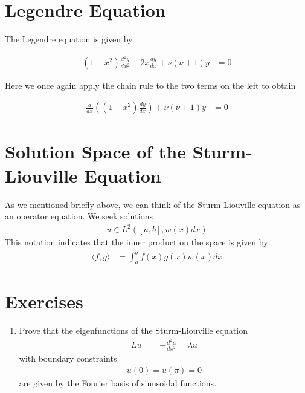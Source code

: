 \documentclass[book.tex]{subfiles}
\begin{document}
\section{Legendre Equation}
The Legendre equation is given by

\begin{align}
    (1 - x^2)\frac{d^2 y}{dx^2} - 2 x \frac{dy}{dx} + \nu (\nu + 1) y &= 0
\end{align}

Here we once again apply the chain rule to the two terms on the left to obtain

\begin{align}
    \frac{d}{dx} \left ( (1 - x^2)\frac{dy}{dx}  \right ) + \nu (\nu + 1) y &= 0
\end{align}

\section{Solution Space of the Sturm-Liouville Equation}

As we mentioned briefly above, we can think of the Sturm-Liouville equation as an operator equation. We seek solutions 
\begin{align}
    u \in L^2([a, b], w(x)dx)
\end{align}
This notation indicates that the inner product on the space is given by
\begin{align}
    \langle f, g \rangle &= \int_a^b \overline{f(x)} g(x) w(x) dx
\end{align}

\section{Exercises}
\begin{enumerate}
    \item Prove that the eigenfunctions of the Sturm-Liouville equation
    \begin{align}
        L u &= -\frac{d^2 u}{dx^2} = \lambda u
    \end{align}
    with boundary constraints
    \begin{align}
        u(0) = u(\pi) = 0
    \end{align}
    are given by the Fourier basis of sinusoidal functions.
\end{enumerate}
\end{document}
